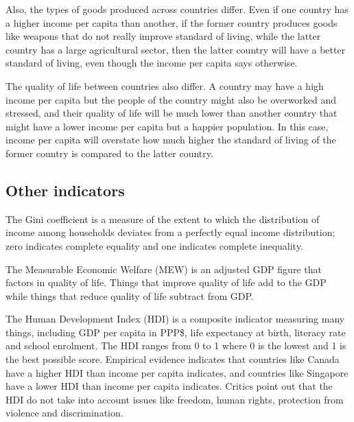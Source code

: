 \documentclass[Economics.tex]{subfiles}
\begin{document}
Also, the types of goods produced across countries differ. Even if one country has a higher income per capita than another, if the former country produces goods like weapons that do not really improve standard of living, while the latter country has a large agricultural sector, then the latter country will have a better standard of living, even though the income per capita says otherwise.

The quality of life between countries also differ. A country may have a high income per capita but the people of the country might also be overworked and stressed, and their quality of life will be much lower than another country that might have a lower income per capita but a happier population. In this case, income per capita will overstate how much higher the standard of living of the former country is compared to the latter country.
\subsection{Other indicators}
The Gini coefficient is a measure of the extent to which the distribution of income among households deviates from a perfectly equal income distribution; zero indicates complete equality and one indicates complete inequality.

The Measurable Economic Welfare (MEW) is an adjusted GDP figure that factors in quality of life. Things that improve quality of life add to the GDP while things that reduce quality of life subtract from GDP.

The Human Development Index (HDI) is a composite indicator measuring many things, including GDP per capita in PPP\$, life expectancy at birth, literacy rate and school enrolment. The HDI ranges from 0 to 1 where 0 is the lowest and 1 is the best possible score. Empirical evidence indicates that countries like Canada have a higher HDI than income per capita indicates, and countries like Singapore have a lower HDI than income per capita indicates. Critics point out that the HDI do not take into account issues like freedom, human rights, protection from violence and discrimination.
\end{document}
